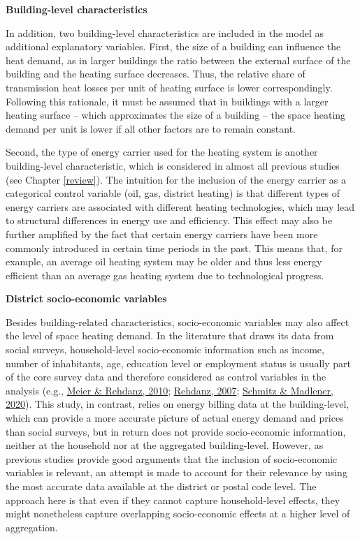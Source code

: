 \documentclass[12pt,twoside]{reedthesis}
\begin{document}
\textbf{Building-level characteristics}

In addition, two building-level characteristics are included in the model as additional explanatory variables. First, the size of a building can influence the heat demand, as in larger buildings the ratio between the external surface of the building and the heating surface decreases. Thus, the relative share of transmission heat losses per unit of heating surface is lower correspondingly. Following this rationale, it must be assumed that in buildings with a larger heating surface -- which approximates the size of a building -- the space heating demand per unit is lower if all other factors are to remain constant.

Second, the type of energy carrier used for the heating system is another building-level characteristic, which is considered in almost all previous studies (see Chapter \ref{review}). The intuition for the inclusion of the energy carrier as a categorical control variable (oil, gas, district heating) is that different types of energy carriers are associated with different heating technologies, which may lead to structural differences in energy use and efficiency. This effect may also be further amplified by the fact that certain energy carriers have been more commonly introduced in certain time periods in the past. This means that, for example, an average oil heating system may be older and thus less energy efficient than an average gas heating system due to technological progress.

\textbf{District socio-economic variables}

Besides building-related characteristics, socio-economic variables may also affect the level of space heating demand. In the literature that draws its data from social surveys, household-level socio-economic information such as income, number of inhabitants, age, education level or employment status is usually part of the core survey data and therefore considered as control variables in the analysis (e.g., \protect\hyperlink{ref-meier_rehdanz10}{Meier \& Rehdanz, 2010}; \protect\hyperlink{ref-rehdanz07}{Rehdanz, 2007}; \protect\hyperlink{ref-schmitz_madlener20}{Schmitz \& Madlener, 2020}). This study, in contrast, relies on energy billing data at the building-level, which can provide a more accurate picture of actual energy demand and prices than social surveys, but in return does not provide socio-economic information, neither at the household nor at the aggregated building-level. However, as previous studies provide good arguments that the inclusion of socio-economic variables is relevant, an attempt is made to account for their relevance by using the most accurate data available at the district or postal code level. The approach here is that even if they cannot capture household-level effects, they might nonetheless capture overlapping socio-economic effects at a higher level of aggregation.
\end{document}
